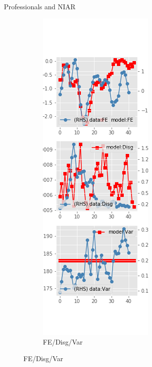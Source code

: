 \documentclass{beamer}
\begin{document}
\begin{frame}{Professionals and NIAR}
\begin{figure}[ht]
\begin{subfigure}[b]{0.2\textwidth}
		\end{subfigure}
		\hfill
		\begin{subfigure}[b]{0.2\textwidth}
			\caption{FE/Disg/Var}
			\includegraphics[width=\textwidth, height = 0.8\textheight]{figuresDraft/spf_ni_est_diag2.png}
		\end{subfigure}
	\end{figure}
	\end{frame}
\end{document}
